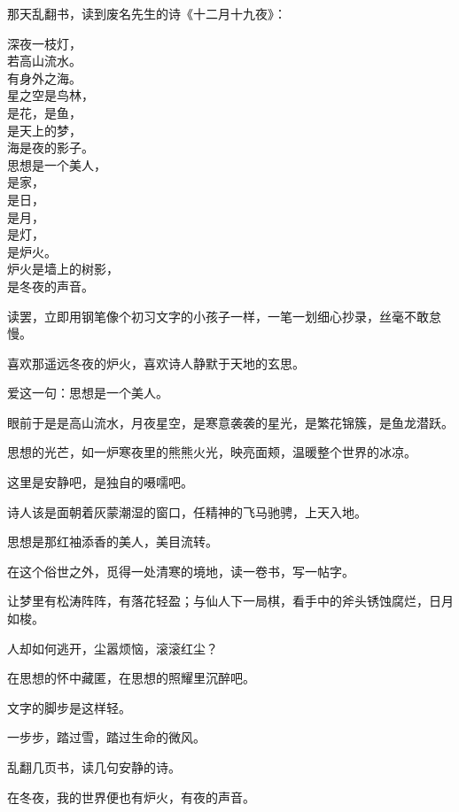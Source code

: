 \documentclass[12pt,a4paper]{article}
\begin{document}

		那天乱翻书，读到废名先生的诗《十二月十九夜》：

		\longpoem{}{}{}
		深夜一枝灯，\\
		若高山流水。\\
		有身外之海。\\
		星之空是鸟林，\\
		是花，是鱼，\\
		是天上的梦，\\
		海是夜的影子。\\
		思想是一个美人，\\
		是家，\\
		是日，\\
		是月，\\
		是灯，\\
		是炉火。\\
		炉火是墙上的树影，\\
		是冬夜的声音。
		\endlongpoem

		读罢，立即用钢笔像个初习文字的小孩子一样，一笔一划细心抄录，丝毫不敢怠慢。\par
		喜欢那遥远冬夜的炉火，喜欢诗人静默于天地的玄思。\par
		爱这一句：思想是一个美人。

		眼前于是是高山流水，月夜星空，是寒意袭袭的星光，是繁花锦簇，是鱼龙潜跃。\par
		思想的光芒，如一炉寒夜里的熊熊火光，映亮面颊，温暖整个世界的冰凉。

		这里是安静吧，是独自的嗫嚅吧。\par
		诗人该是面朝着灰蒙潮湿的窗口，任精神的飞马驰骋，上天入地。

		思想是那红袖添香的美人，美目流转。

		在这个俗世之外，觅得一处清寒的境地，读一卷书，写一帖字。\par
		让梦里有松涛阵阵，有落花轻盈；与仙人下一局棋，看手中的斧头锈蚀腐烂，日月如梭。

		人却如何逃开，尘嚣烦恼，滚滚红尘？\par
		在思想的怀中藏匿，在思想的照耀里沉醉吧。

		文字的脚步是这样轻。\par
		一步步，踏过雪，踏过生命的微风。\par
		乱翻几页书，读几句安静的诗。\par
		在冬夜，我的世界便也有炉火，有夜的声音。

	\endwriting


\end{document}
